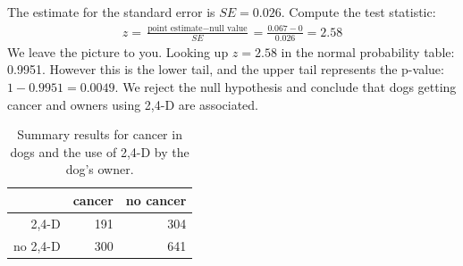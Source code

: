 \begin{examplewrap}
\begin{nexample}

The estimate for the standard error is $SE = 0.026$. 
Compute the test statistic:
\begin{eqnarray*}
z = \frac{\text{point estimate} - \text{null value}}{SE} = \frac{0.067 - 0}{0.026} = 2.58
\end{eqnarray*}
We leave the picture to you. Looking up $z=2.58$ in the normal probability table: 0.9951. However this is the lower tail, and the upper tail represents the p-value: $1-0.9951 = 0.0049$. We reject the null hypothesis and conclude that dogs getting cancer and owners using 2,4-D are associated.
    \end{nexample}
\end{examplewrap}
\begin{table}[h]
\centering
\begin{tabular}{rrr}
  \hline
 & cancer & no cancer \\
  \hline
2,4-D & 191 & 304 \\
no 2,4-D & 300 & 641 \\
   \hline
\end{tabular}
\caption{Summary results for cancer in dogs and the use of 2,4-D by the dog's owner.}
\label{24DAndCancerInDogs}
\end{table}

